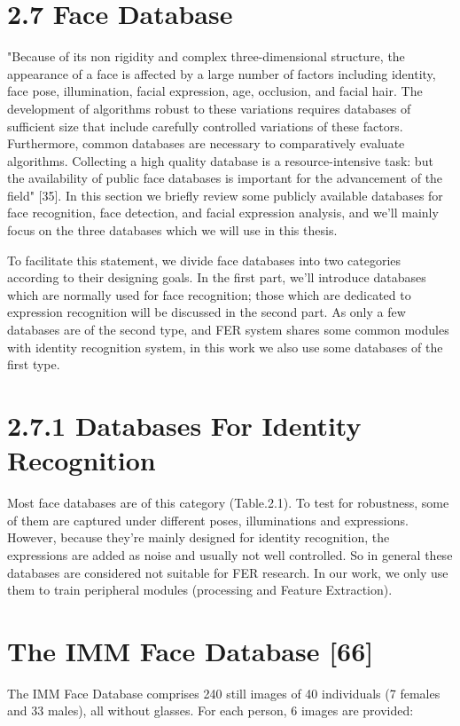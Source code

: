 \documentclass[12pt]{report}
\begin{document}
\section*{2.7 Face Database}
"Because of its non rigidity and complex three-dimensional structure, the appearance of a face is affected by a large number of factors including identity, face pose, illumination, facial expression, age, occlusion, and facial hair. The development of algorithms robust to these variations requires databases of sufficient size that include carefully controlled variations of these factors. Furthermore, common databases are necessary to comparatively evaluate algorithms. Collecting a high quality database is a resource-intensive task: but the availability of public face databases is important for the advancement of the field" [35]. In this section we briefly review some publicly available databases for face recognition, face detection, and facial expression analysis, and we'll mainly focus on the three databases which we will use in this thesis. 
\par
To facilitate this statement, we divide face databases into two categories according to their designing goals. In the first part, we'll introduce databases which are normally used for face recognition; those which are dedicated to expression recognition will be discussed in the second part. As only a few databases are of the second type, and FER system shares some common modules with identity recognition system, in this work we also use some databases of the first type.

\section*{2.7.1 Databases For Identity Recognition}
Most face databases are of this category (Table.2.1). To test for robustness, some of them are captured under different poses, illuminations and expressions. However, because they're mainly designed for identity recognition, the expressions are added as noise and usually not well controlled. So in general these databases are considered not suitable for FER research. In our work, we only use them to train peripheral modules (processing and Feature Extraction).

\section*{The IMM Face Database [66]}
The IMM Face Database comprises 240 still images of 40 individuals (7 females and 33 males), all without glasses. For each person, 6 images are provided:
\end{document}
